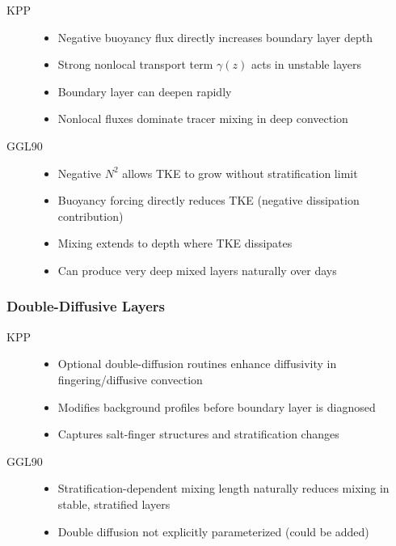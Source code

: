 \documentclass[11pt, a4paper]{article}
\begin{document}
\begin{description}
    \item[KPP]
    \begin{itemize}
        \item Negative buoyancy flux directly increases boundary layer depth
        \item Strong nonlocal transport term $\gamma(z)$ acts in unstable layers
        \item Boundary layer can deepen rapidly
        \item Nonlocal fluxes dominate tracer mixing in deep convection
    \end{itemize}
    
    \item[GGL90]
    \begin{itemize}
        \item Negative $N^2$ allows TKE to grow without stratification limit
        \item Buoyancy forcing directly reduces TKE (negative dissipation contribution)
        \item Mixing extends to depth where TKE dissipates
        \item Can produce very deep mixed layers naturally over days
    \end{itemize}
\end{description}

\subsubsection{Double-Diffusive Layers}

\begin{description}
    \item[KPP]
    \begin{itemize}
        \item Optional double-diffusion routines enhance diffusivity in fingering/diffusive convection
        \item Modifies background profiles before boundary layer is diagnosed
        \item Captures salt-finger structures and stratification changes
    \end{itemize}
    
    \item[GGL90]
    \begin{itemize}
        \item Stratification-dependent mixing length naturally reduces mixing in stable, stratified layers
        \item Double diffusion not explicitly parameterized (could be added)
    \end{itemize}
\end{description}
\end{document}
